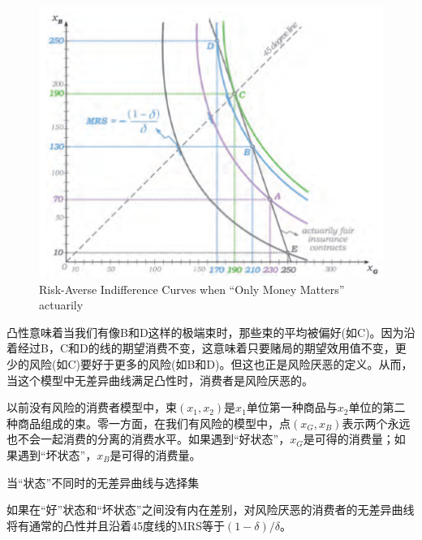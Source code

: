 \documentclass{article}
\begin{document}
\begin{figure}[H] %
	\centering %
	\includegraphics[width=1\textwidth]{17_4} %
	\caption{Risk-Averse Indifference Curves when “Only Money Matters”
		actuarily} %
	\label{Fig.main5} %
\end{figure}

凸性意味着当我们有像B和D这样的极端束时，那些束的平均被偏好(如C)。因为沿着经过B，C和D的线的期望消费不变，这意味着只要赌局的期望效用值不变，更少的风险(如C)要好于更多的风险(如B和D)。但这也正是风险厌恶的定义。从而，当这个模型中无差异曲线满足凸性时，消费者是风险厌恶的。

以前没有风险的消费者模型中，束$ (x_1,x_2) $是$ x_1 $单位第一种商品与$ x_2 $单位的第二种商品组成的束。零一方面，在我们有风险的模型中，点$ (x_G,x_B) $表示两个永远也不会一起消费的分离的消费水平。如果遇到“好状态”，$ x_G $是可得的消费量；如果遇到“坏状态”，$ x_B $是可得的消费量。

\hspace*{\fill}

当“状态”不同时的无差异曲线与选择集

如果在“好”状态和“坏状态”之间没有内在差别，对风险厌恶的消费者的无差异曲线将有通常的凸性并且沿着45度线的MRS等于$ (1-\delta)/\delta $。
\end{document}
